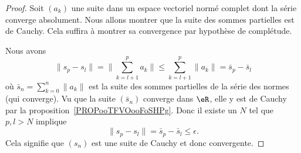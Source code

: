 \begin{proof}
    Soit \( (a_k)\) une suite dans un espace vectoriel normé complet dont la série converge absolument. Nous allons montrer que la suite des sommes partielles est de Cauchy. Cela suffira à montrer sa convergence par hypothèse de complétude.

    Nous avons
    \begin{equation}
        \| s_p-s_l \|=\| \sum_{k=l+1}^{p}a_k\|  \leq\sum_{k=l+1}^p\| a_k \|=\bar s_p-\bar s_l
    \end{equation}
    où \( \bar s_n=\sum_{k=0}^n \| a_k \|\) est la suite des sommes partielles de la série des normes (qui converge). Vu que la suite \( (\bar s_n)\) converge dans \( \eR\), elle y est de Cauchy par la proposition~\ref{PROPooTFVOooFoSHPg}. Donc il existe un \( N\) tel que \( p,l>N\) implique
    \begin{equation}
        \| s_p-s_l \|=\bar s_p-\bar s_l\leq \epsilon.
    \end{equation}
    Cela signifie que \( (s_n)\) est une suite de Cauchy et donc convergente.
\end{proof}

